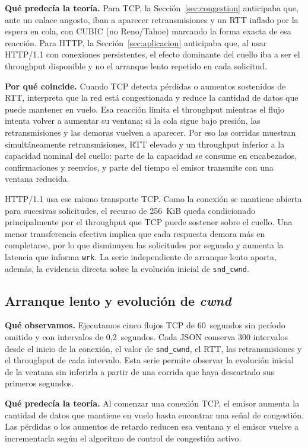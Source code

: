 \documentclass[11pt,a4paper]{article}
\begin{document}
\textbf{Qu\'e predec\'ia la teor\'ia.} Para TCP, la Secci\'on~\ref{sec:congestion} anticipaba que, ante un enlace angosto, iban a aparecer retransmisiones y un RTT inflado por la espera en cola, con CUBIC (no Reno/Tahoe) marcando la forma exacta de esa reacci\'on. Para HTTP, la Secci\'on~\ref{sec:aplicacion} anticipaba que, al usar HTTP/1.1 con conexiones persistentes, el efecto dominante del cuello iba a ser el throughput disponible y no el arranque lento repetido en cada solicitud.

\textbf{Por qu\'e coincide.} Cuando TCP detecta p\'erdidas o aumentos sostenidos de RTT, interpreta que la red est\'a congestionada y reduce la cantidad de datos que puede mantener en vuelo. Esa reacci\'on limita el throughput mientras el flujo intenta volver a aumentar su ventana; si la cola sigue bajo presi\'on, las retransmisiones y las demoras vuelven a aparecer. Por eso las corridas muestran simult\'aneamente retransmisiones, RTT elevado y un throughput inferior a la capacidad nominal del cuello: parte de la capacidad se consume en encabezados, confirmaciones y reenv\'ios, y parte del tiempo el emisor transmite con una ventana reducida.

HTTP/1.1 usa ese mismo transporte TCP. Como la conexi\'on se mantiene abierta para sucesivas solicitudes, el recurso de 256~KiB queda condicionado principalmente por el throughput que TCP puede sostener sobre el cuello. Una menor transferencia efectiva implica que cada respuesta demora m\'as en completarse, por lo que disminuyen las solicitudes por segundo y aumenta la latencia que informa \texttt{wrk}. La serie independiente de arranque lento aporta, adem\'as, la evidencia directa sobre la evoluci\'on inicial de \texttt{snd\_cwnd}.

\subsection*{Arranque lento y evoluci\'on de \textit{cwnd}}

\textbf{Qu\'e observamos.} Ejecutamos cinco flujos TCP de 60~segundos sin per\'iodo omitido y con intervalos de 0,2~segundos. Cada JSON conserva 300 intervalos desde el inicio de la conexi\'on, el valor de \texttt{snd\_cwnd}, el RTT, las retransmisiones y el throughput de cada intervalo. Esta serie permite observar la evoluci\'on inicial de la ventana sin inferirla a partir de una corrida que haya descartado sus primeros segundos.

\textbf{Qu\'e predec\'ia la teor\'ia.} Al comenzar una conexi\'on TCP, el emisor aumenta la cantidad de datos que mantiene en vuelo hasta encontrar una se\~nal de congesti\'on. Las p\'erdidas o los aumentos de retardo reducen esa ventana y el emisor vuelve a incrementarla seg\'un el algoritmo de control de congesti\'on activo.
\end{document}
